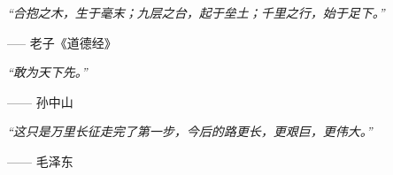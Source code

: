 \setlength{}
\setlength\epigraphrule{0pt}

\thispagestyle{empty}

\begin{center}
\epigraph{\itshape ``合抱之木，生于毫末；九层之台，起于垒土；千里之行，始于足下。''}{----- 老子《道德经》}
\epigraph{\itshape ``敢为天下先。''}{------ 孙中山}
\epigraph{\itshape ``这只是万里长征走完了第一步，今后的路更长，更艰巨，更伟大。''}{------ 毛泽东}
\end{center}

\setlength{\abovedisplayskip}{-5pt}
\setlength{\abovedisplayshortskip}{-5pt}
